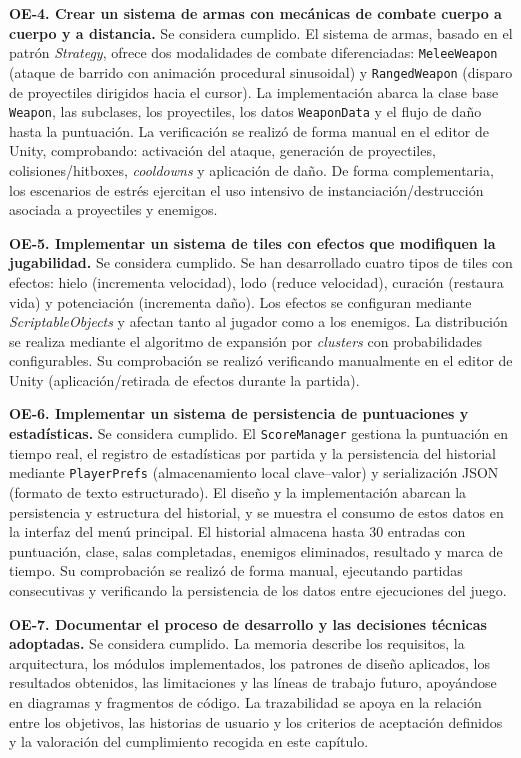 \textbf{OE-4. Crear un sistema de armas con mecánicas de combate cuerpo a cuerpo y a distancia.} Se considera cumplido. El sistema de armas, basado en el patrón \textit{Strategy}, ofrece dos modalidades de combate diferenciadas: \texttt{MeleeWeapon} (ataque de barrido con animación procedural sinusoidal) y \texttt{RangedWeapon} (disparo de proyectiles dirigidos hacia el cursor). La implementación abarca la clase base \texttt{Weapon}, las subclases, los proyectiles, los datos \texttt{WeaponData} y el flujo de daño hasta la puntuación. La verificación se realizó de forma manual en el editor de Unity, comprobando: activación del ataque, generación de proyectiles, colisiones/hitboxes, \textit{cooldowns} y aplicación de daño. De forma complementaria, los escenarios de estrés ejercitan el uso intensivo de instanciación/destrucción asociada a proyectiles y enemigos.

\textbf{OE-5. Implementar un sistema de tiles con efectos que modifiquen la jugabilidad.} Se considera cumplido. Se han desarrollado cuatro tipos de tiles con efectos: hielo (incrementa velocidad), lodo (reduce velocidad), curación (restaura vida) y potenciación (incrementa daño). Los efectos se configuran mediante \textit{ScriptableObjects} y afectan tanto al jugador como a los enemigos. La distribución se realiza mediante el algoritmo de expansión por \textit{clusters} con probabilidades configurables. Su comprobación se realizó verificando manualmente en el editor de Unity (aplicación/retirada de efectos durante la partida).

\textbf{OE-6. Implementar un sistema de persistencia de puntuaciones y estadísticas.} Se considera cumplido. El \texttt{ScoreManager} gestiona la puntuación en tiempo real, el registro de estadísticas por partida y la persistencia del historial mediante \texttt{PlayerPrefs} (almacenamiento local clave–valor) y serialización JSON (formato de texto estructurado). El diseño y la implementación abarcan la persistencia y estructura del historial, y se muestra el consumo de estos datos en la interfaz del menú principal. El historial almacena hasta 30 entradas con puntuación, clase, salas completadas, enemigos eliminados, resultado y marca de tiempo. Su comprobación se realizó de forma manual, ejecutando partidas consecutivas y verificando la persistencia de los datos entre ejecuciones del juego.

\textbf{OE-7. Documentar el proceso de desarrollo y las decisiones técnicas adoptadas.} Se considera cumplido. La memoria describe los requisitos, la arquitectura, los módulos implementados, los patrones de diseño aplicados, los resultados obtenidos, las limitaciones y las líneas de trabajo futuro, apoyándose en diagramas y fragmentos de código. La trazabilidad se apoya en la relación entre los objetivos, las historias de usuario y los criterios de aceptación definidos y la valoración del cumplimiento recogida en este capítulo.

